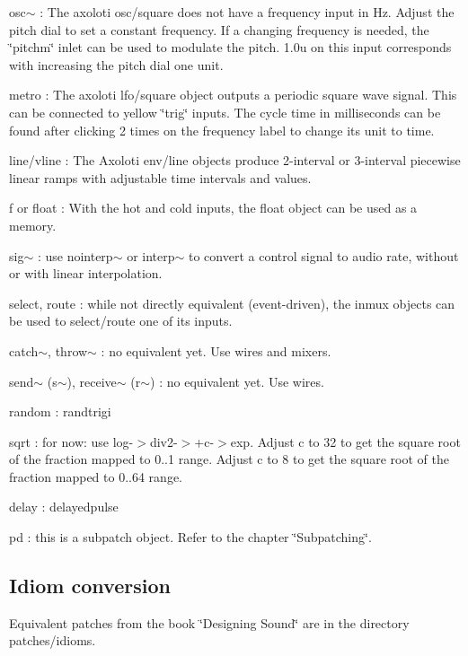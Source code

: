 \begin{DoxyItemize}
\item osc$\sim$ \+: The axoloti osc/square does not have a frequency input in Hz. Adjust the pitch dial to set a constant frequency. If a changing frequency is needed, the \char`\"{}pitchm\char`\"{} inlet can be used to modulate the pitch. 1.\+0u on this input corresponds with increasing the pitch dial one unit. 
\item metro \+: The axoloti lfo/square object outputs a periodic square wave signal. This can be connected to yellow \char`\"{}trig\char`\"{} inputs. The cycle time in milliseconds can be found after clicking 2 times on the frequency label to change its unit to time. 
\item line/vline \+: The Axoloti env/line objects produce 2-\/interval or 3-\/interval piecewise linear ramps with adjustable time intervals and values. 
\item f or float \+: With the hot and cold inputs, the float object can be used as a memory. 
\item sig$\sim$ \+: use nointerp$\sim$ or interp$\sim$ to convert a control signal to audio rate, without or with linear interpolation. 
\item select, route \+: while not directly equivalent (event-\/driven), the inmux objects can be used to select/route one of its inputs. 
\item catch$\sim$, throw$\sim$ \+: no equivalent yet. Use wires and mixers. 
\item send$\sim$ (s$\sim$), receive$\sim$ (r$\sim$) \+: no equivalent yet. Use wires. 
\item random \+: randtrigi 
\item sqrt \+: for now\+: use log-\/$>$div2-\/$>$+c-\/$>$exp. Adjust c to 32 to get the square root of the fraction mapped to 0..1 range. Adjust c to 8 to get the square root of the fraction mapped to 0..64 range. 
\item delay \+: delayedpulse 
\item pd \+: this is a subpatch object. Refer to the chapter \char`\"{}\+Subpatching\char`\"{}. 
\end{DoxyItemize}\hypertarget{md_pd_user_pd_user_idiom_conversion}{}\subsection{Idiom conversion}\label{md_pd_user_pd_user_idiom_conversion}
Equivalent patches from the book \char`\"{}\+Designing Sound\char`\"{} are in the directory patches/idioms.

